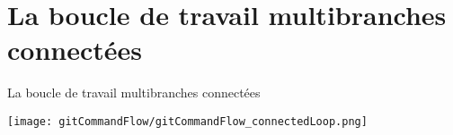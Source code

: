 \documentclass{beamer}
\begin{document}
\section{La boucle de travail multibranches connectées}

\begin{frame}{La boucle de travail multibranches connectées}
\begin{center}
	\texttt{[image: gitCommandFlow/gitCommandFlow\_connectedLoop.png]}
\end{center}
\end{frame}
\end{document}
